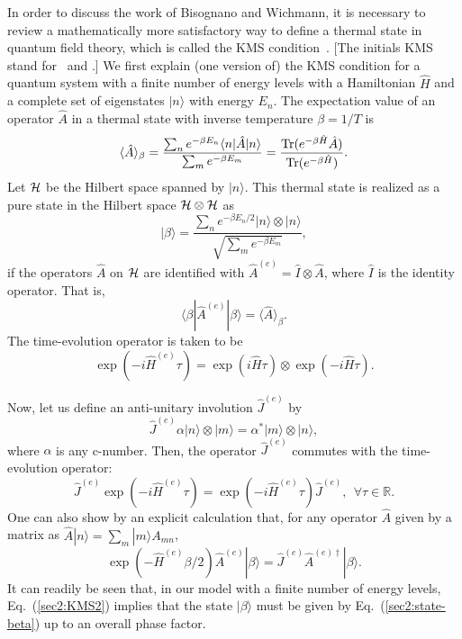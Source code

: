 \documentclass[12pt,nofootinbib,floatfix,aps,prd,showpacs,amsmath,amssymb,eqsecnum]{revtex4-2}
\let\cite\citep
\begin{document}
In order to discuss the work of Bisognano and Wichmann, 
it is necessary to review a mathematically more satisfactory way to
define a thermal state in quantum field theory, which is called the KMS
condition~\cite{Haagetal67}.  [The initials KMS stand 
for~\textcite{Kubo57} and \textcite{Martinetal59}.]  
We first explain (one version of) the KMS condition 
for a quantum system with a finite number of energy levels
with a Hamiltonian $\hat{H}$ and a complete set of eigenstates
$|n\rangle$ with energy $E_n$. 
The expectation value of an operator $\hat{A}$ 
in a thermal state with inverse temperature $\beta = 1/T$ is
\begin{equation}
\langle \hat{A}\rangle_\beta = \frac{\sum_{n}e^{-\beta E_n}\langle
n|\hat{A}|n\rangle}{\sum_{m} e^{-\beta E_m}}
= \frac{{\rm Tr}(e^{-\beta \hat{H}}\hat{A})}{{\rm Tr}
( e^{-\beta \hat{H}})}.
\end{equation}
Let ${\cal H}$ be the Hilbert space spanned by $|n\rangle$.  This
thermal state is realized as a pure state in the Hilbert space
${\cal H}\otimes {\cal H}$ as 
\begin{equation}
|\beta\rangle = \frac{\sum_n e^{-\beta E_n/2}
|n\rangle \otimes |n\rangle}{\sqrt{\sum_{m}e^{-\beta E_m}}},
\label{sec2:state-beta}
\end{equation}
if the operators $\hat{A}$ on ${\cal H}$ are
identified with 
$
\hat{A}^{(e)} = \hat{I} \otimes \hat{A}
$,
where $\hat{I}$ is the identity operator.  That is,
\begin{equation}
\langle \beta|\hat{A}^{(e)}|\beta\rangle = 
\langle \hat{A}\rangle_\beta.
\end{equation}  
The time-evolution operator is taken to be
\begin{equation}
\exp(-i\hat{H}^{(e)}\tau) = 
\exp(i\hat{H}\tau)\otimes \exp(-i\hat{H}\tau). \label{sec2:extendedH}
\end{equation}

Now, let us define an anti-unitary involution $\hat{J}^{(e)}$ by
\begin{equation}
\hat{J}^{(e)}\alpha |n\rangle\otimes |m\rangle = \alpha^*|m\rangle \otimes
|n\rangle,
\end{equation}
where $\alpha$ is any c-number.  Then, the operator $\hat{J}^{(e)}$ commutes
with the time-evolution operator:
\begin{equation}
\hat{J}^{(e)}\exp(-i\hat{H}^{(e)}\tau) 
= \exp(-i\hat{H}^{(e)}\tau)\hat{J}^{(e)},\ \ \forall 
\tau\in \mathbb{R}.  \label{sec2:KMS1}
\end{equation}
One can also show by an explicit calculation that,
for any operator $\hat{A}$ given by
a matrix as $\hat{A}|n\rangle = \sum_m |m\rangle A_{mn}$,
\begin{equation}
\exp(-\hat{H}^{(e)}\beta/2)\hat{A}^{(e)}|\beta\rangle = \hat{J}^{(e)} 
\hat{A}^{(e)\dagger}|\beta\rangle.
\label{sec2:KMS2}
\end{equation}
It can readily be seen that, in our model
with a finite number of energy levels, Eq.~(\ref{sec2:KMS2})
implies that the state $|\beta\rangle$ must be given by
Eq.~(\ref{sec2:state-beta}) up to an overall phase factor.
\end{document}

